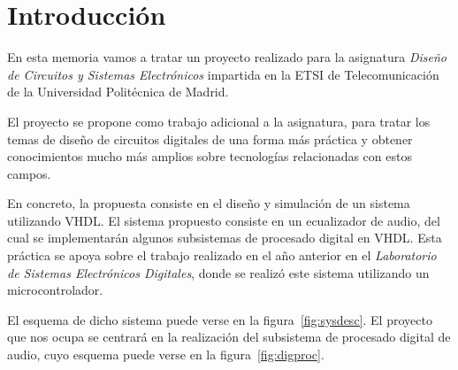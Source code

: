 \documentclass[a4paper,12pt]{article}
\begin{document}
\newcommand\litem[1]{\item{\bfseries #1 }}
\renewcommand{\arraystretch}{1.5} %

\newcommand\headcell[1]{%
  \multicolumn{1}{c|}{\cellcolor{MidnightBlue}\bfseries\sffamily\textcolor{white}{#1}}
}
\newcommand\headcelld[1]{%
  \multicolumn{1}{c||}{\cellcolor{MidnightBlue}\bfseries\sffamily\textcolor{white}{#1}}
}

%




\newpage
\tableofcontents %

\section*{Introducción}
En esta memoria vamos a tratar un proyecto realizado para la asignatura \emph{Diseño de Circuitos y Sistemas Electrónicos} impartida en la ETSI de Telecomunicación de la Universidad Politécnica de Madrid.

El proyecto se propone como trabajo adicional a la asignatura, para tratar los temas de diseño de circuitos digitales de una forma más práctica y obtener conocimientos mucho más amplios sobre tecnologías relacionadas con estos campos.

En concreto, la propuesta consiste en el diseño y simulación de un sistema utilizando VHDL. El sistema propuesto consiste en un ecualizador de audio, del cual se implementarán algunos subsistemas de procesado digital en VHDL. Esta práctica se apoya sobre el trabajo realizado en el año anterior en el \emph{Laboratorio de Sistemas Electrónicos Digitales}, donde se realizó este sistema utilizando un microcontrolador.

El esquema de dicho sistema puede verse en la figura~\ref{fig:sysdesc}. El proyecto que nos ocupa se centrará en la realización del subsistema de procesado digital de audio, cuyo esquema puede verse en la figura~\ref{fig:digproc}.
\end{document}
